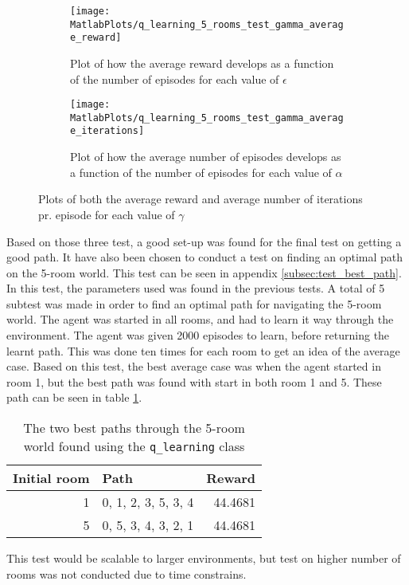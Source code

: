 \documentclass[../Head/Main.tex]{subfiles}
\begin{document}
\begin{figure}[H]
	\centering
	\begin{subfigure}[b]{0.49\textwidth}
		\centering
		\texttt{[image: MatlabPlots/q\_learning\_5\_rooms\_test\_gamma\_average\_reward]}
		\caption{Plot of how the average reward develops as a function of the number of episodes for each value of $\epsilon$}
		\label{fig:q-learn_gamma_reward_impl}
	\end{subfigure}
	\hfill
	\begin{subfigure}[b]{0.49\textwidth}
		\centering
		\texttt{[image: MatlabPlots/q\_learning\_5\_rooms\_test\_gamma\_average\_iterations]}
		\caption{Plot of how the average number of episodes develops as a function of the number of episodes for each value of $\alpha$}
		\label{fig:q-learn_gamma_iterations_impl}
	\end{subfigure}
	\caption{Plots of both the average reward and average number of iterations pr. episode for each value of $\gamma$}
	\label{fig:q-learn_gamma_impl}
\end{figure}
Based on those three test, a good set-up was found for the final test on getting a good path. It have also been chosen to conduct a test on finding an optimal path on the 5-room world. This test can be seen in appendix \ref{subsec:test_best_path}. In this test, the parameters used was found in the previous tests. A total of 5 subtest was made in order to find an optimal path for navigating the 5-room world. The agent was started in all rooms, and had to learn it way through the environment. The agent was given 2000 episodes to learn, before returning the learnt path. This was done ten times for each room to get an idea of the average case. Based on this test, the best average case was when the agent started in room 1, but the best path was found with start in both room 1 and 5. These path can be seen in table \ref{tab:q_learn_result}.

\begin{table}[H]
	\centering
	\begin{tabular}{r l r}
	\hline
	\multicolumn{1}{l}{\textbf{Initial room}} & \textbf{Path} & \textbf{Reward} \\ 			\hline
	1  & 0, 1, 2, 3, 5, 3, 4  & 44.4681\\
	5  & 0, 5, 3, 4, 3, 2, 1  & 44.4681\\
	\hline
	\end{tabular}
	\caption{The two best paths through the 5-room world found using the \texttt{q\_learning} class}
	\label{tab:q_learn_result}
\end{table}
This test would be scalable to larger environments, but test on higher number of rooms was not conducted due to time constrains.
\end{document}
